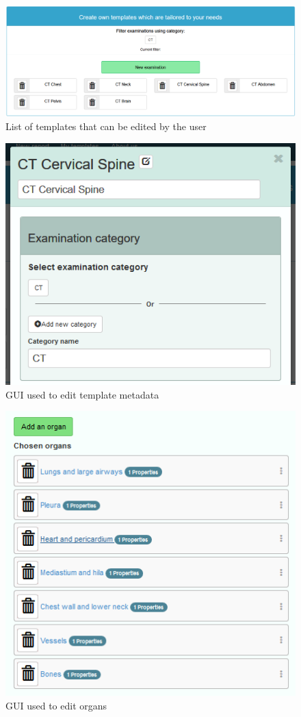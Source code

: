 \documentclass[12pt, twoside, openany]{report}
\theoremstyle{definition}
\begin{document}
\begin{figure}
    \centering
    \includegraphics[width=0.9\linewidth]{templates-list.PNG}
    \caption{List of templates that can be edited by the user\label{fig:templates-list}}
\end{figure}
\begin{figure}
    \centering
    \includegraphics{template-metadata.PNG}
    \caption{GUI used to edit template metadata \label{fig:template-metadata}}
\end{figure}
\begin{figure}
    \centering
    \includegraphics{template-organs-list.PNG}
    \caption{GUI used to edit organs \label{fig:template-organs-list}}
\end{figure}
\end{document}
